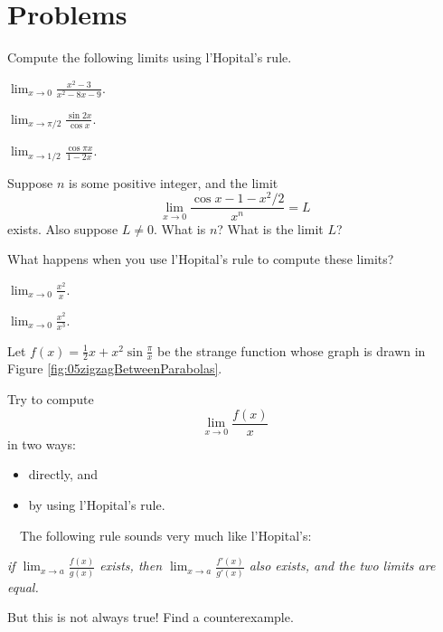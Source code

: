 \section{Problems} %
\problemfont %
\begin{multicols}{2}
\problem Compute the following limits using l'Hopital's rule. %




\subprob $\displaystyle \lim_{x\to 0} \frac{x^2-3} {x^2-8x-9}$.




\subprob $\displaystyle\lim_{x\to \pi/2} \frac{\sin 2x} {\cos x}$.




\subprob $\displaystyle\lim_{x\to 1/2} \frac{\cos \pi x} {1-2x}$.








\problem Suppose $n$ is some positive integer, and the limit %
\[
\lim_{x\to0} \frac{\cos x -1 -x^2/2} {x^n} = L
\]
exists. Also suppose $L\neq0$.
What is $n$?  What is the limit $L$?












\problem What happens when you use l'Hopital's rule to compute these %
limits?




\subprob $\displaystyle\lim_{x\to 0} \frac{x^2} {x}$.




\subprob $\displaystyle\lim_{x\to 0} \frac{x^2} {x^3}$.




\problem  Let $f(x) = \frac12x + x^2\sin\frac\pi x$ be the strange %
function whose graph is drawn in Figure
\ref{fig:05zigzagBetweenParabolas}.




\subprob Try to compute
\[
\lim_{x\to 0} \frac{f(x)} {x}
\]
in two ways:
\begin{itemize}
\item directly, and
\item by using l'Hopital's rule.
\end{itemize}




\subprob \carefulnow\carefulnow~~The following rule sounds very much
like l'Hopital's:
\begin{center}
  \itshape if $\displaystyle\lim_{x\to a} \frac{f(x)} {g(x)}$ exists,
  then $\displaystyle\lim_{x\to a} \frac{f'(x)} {g'(x)}$ also exists,
  and the two limits are equal.
\end{center}
But this is not always true!  Find a counterexample.









\end{multicols}
